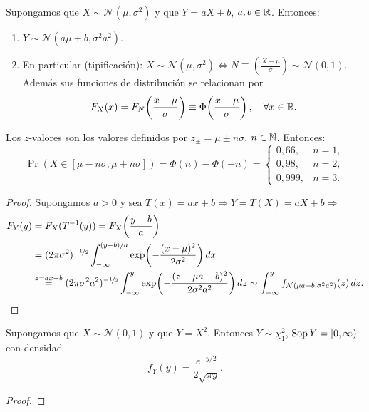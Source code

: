 \textcolor{azulresalt}{
\begin{proposicion}[25]
Supongamos que $X \sim \mathcal{N}(\mu, \sigma^2)$ y que $Y = aX + b$, $a, b \in \mathbb{R}$. Entonces:
\begin{enumerate}
  \item $Y \sim \mathcal{N}(a\mu + b, \sigma^2 a^2)$.
  \item En particular (tipificación): $X \sim \mathcal{N}(\mu, \sigma^2) \iff N \equiv \left(\frac{X-\mu}{\sigma}\right) \sim \mathcal{N}(0,1)$.
        Además sus funciones de distribución se relacionan por
        \begin{equation*}
          F_X(x) = F_N\!\left(\frac{x-\mu}{\sigma}\right) \equiv \Phi\!\left(\frac{x-\mu}{\sigma}\right), \quad \forall x \in \mathbb{R}.
        \end{equation*}
\end{enumerate}
Los $z$-valores son los valores definidos por $z_\pm = \mu \pm n\sigma$, $n \in \mathbb{N}$. Entonces:
\begin{equation*}
  \Pr(X \in [\mu - n\sigma, \mu + n\sigma]) = \Phi(n) - \Phi(-n) =
  \begin{cases}
    0{,}66, & n = 1, \\
    0{,}98, & n = 2, \\
    0{,}999, & n = 3.
  \end{cases}
\end{equation*}
\end{proposicion}
\begin{proof}
Supongamos $a > 0$ y sea $T(x) = ax + b \Rightarrow Y = T(X) = aX + b \Rightarrow$
\begin{align*}
  F_Y(y) &= F_X(T^{-1}(y)) = F_X\!\left(\frac{y-b}{a}\right) \\
         &= (2\pi\sigma^2)^{-\nicefrac{1}{2}} \int_{-\infty}^{(y-b)/a} \exp\!\left(-\frac{(x-\mu)^2}{2\sigma^2}\right) dx \\
         &\overset{z=ax+b}{=} (2\pi\sigma^2 a^2)^{-\nicefrac{1}{2}} \int_{-\infty}^y \exp\!\left(-\frac{(z - \mu a - b)^2}{2\sigma^2 a^2}\right) dz \sim \int_{-\infty}^y f_{\mathcal{N}(\mu a + b, \sigma^2 a^2)}(z)\,dz.
\end{align*}
\end{proof}
\begin{proposicion}[26]
Supongamos que $X \sim \mathcal{N}(0,1)$ y que $Y = X^2$. Entonces $Y \sim \chi_1^2$, $\operatorname{Sop} Y = [0, \infty)$ con densidad
\[
  f_Y(y) = \frac{e^{-y/2}}{2\sqrt{\pi y}}.
\]
\end{proposicion}
\begin{proof}

\end{proof}}
